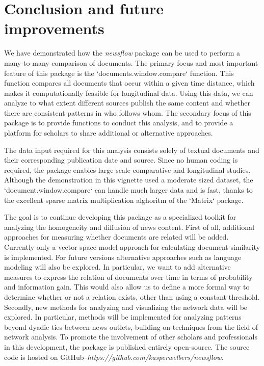 \section{Conclusion and future improvements}

We have demonstrated how the \emph{newsflow} package can be used to perform a many-to-many comparison of documents.
The primary focus and most important feature of this package is the `documents.window.compare` function.
This function compares all documents that occur within a given time distance, which makes it computationally feasible for longitudinal data.
Using this data, we can analyze to what extent different sources publish the same content and whether there are consistent patterns in who follows whom.
The secondary focus of this package is to provide functions to conduct this analysis, and to provide a platform for scholars to share additional or alternative approaches.

The data input required for this analysis consists solely of textual documents and their corresponding publication date and source.
Since no human coding is required, the package enables large scale comparative and longitudinal studies.
Although the demonstration in this vignette used a moderate sized dataset, the `document.window.compare` can handle much larger data and is fast, thanks to the excellent sparse matrix multiplication alghoritm of the `Matrix` package.

The goal is to continue developing this package as a specialized toolkit for analyzing the homogeneity and diffusion of news content.
First of all, additional approaches for measuring whether documents are related will be added.
Currently only a vector space model approach for calculating document similarity is implemented.
For future versions alternative approaches such as language modeling will also be explored.
In particular, we want to add alternative measures to express the relation of documents over time in terms of probability and information gain.
This would also allow us to define a more formal way to determine whether or not a relation exists, other than using a constant threshold.
Secondly, new methods for analyzing and visualizing the network data will be explored. 
In particular, methods will be implemented for analyzing patterns beyond dyadic ties between news outlets, building on techniques from the field of network analysis.
To promote the involvement of other scholars and professionals in this development, the package is published entirely open-source. 
The source code is hosted on GitHub--\emph{https://github.com/kasperwelbers/newsflow}.

